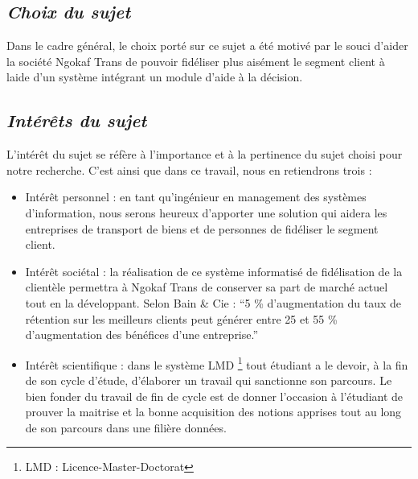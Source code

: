         \subsection[Choix du sujet]{\textit{Choix du sujet}}
        Dans le cadre général, le choix porté sur ce sujet a été motivé par le souci d’aider
        la société Ngokaf Trans de pouvoir fidéliser plus aisément le segment client à laide d’un
        système intégrant un module d’aide à la décision.
        \subsection[Interet du sujet]{\textit{Intérêts du sujet}}
        L’intérêt du sujet se réfère à l’importance et à la pertinence du sujet choisi pour notre recherche.
        C’est ainsi que dans ce travail, nous en retiendrons trois :
         \par 
            \begin{itemize}
                \setlength{\itemsep}{0pt}
                \item [\ding{226}] Intérêt personnel : en tant qu’ingénieur en management 
                des systèmes d’information, nous serons heureux d’apporter une solution
                qui aidera les entreprises de transport de biens et de personnes de fidéliser
                le segment client.
                \item [\ding{226}] Intérêt sociétal : la réalisation de ce système
                informatisé de fidélisation de la clientèle permettra à Ngokaf Trans
                de conserver sa part de marché actuel tout en la développant. 
                Selon Bain \& Cie : \enquote{5 \% d’augmentation du taux de
                rétention sur les meilleurs clients peut générer entre 25 et 55 \%
                d’augmentation des bénéfices d’une entreprise.} \cite*{Siecdigi}
                \item [\ding{226}] Intérêt scientifique : dans le système LMD
                \footnote[1]{LMD : Licence-Master-Doctorat} tout étudiant
                a le devoir, à la fin de son cycle d’étude, d’élaborer un travail qui
                sanctionne son parcours. Le bien fonder du travail de fin de cycle
                est de donner l’occasion à l’étudiant de prouver la maitrise et la bonne acquisition
                des notions apprises tout au long de son parcours dans une filière données.
            \end{itemize}
